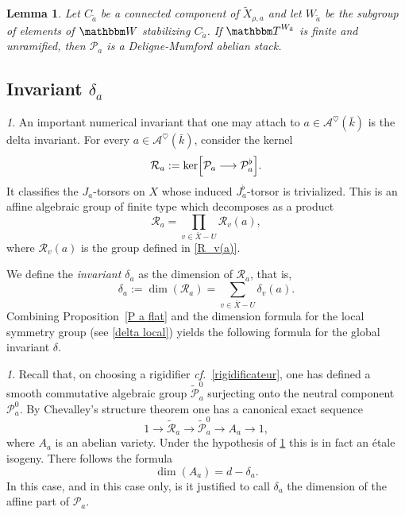 \documentclass[12pt,english]{smfart}
\numberwithin{equation}{subsection}
\newtheorem{lemme}[equation]{Lemma}
\theoremstyle{remark}
\newtheorem{numero}[equation]{}
\newcommand\calP{{\mathscr P}}
\newcommand\calR{{\mathscr R}}
\newcommand\bbW{{\mathbbm W}}
\newcommand\bbT{{\mathbbm T}}
\newcommand\cf{{\it cf.\ }}
\begin{document}
\begin{lemme}\label{P champ abelien}
Let $C_{\tilde a}$ be a connected component of $\widetilde X_{\rho,a}$ and let $W_{\tilde a}$ be the subgroup of elements of $\bbW$ stabilizing $C_{\tilde a}$. If $\bbT^{W_{\tilde a}}$ is finite and unramified, then $\calP_a$ is a Deligne-Mumford abelian stack.
\end{lemme}

\subsection{Invariant $\delta_a$}

\begin{numero}\label{invariant delta}
An important numerical invariant that one may attach to $a\in\mathcal{A}^\heartsuit(\bar k)$ is the delta invariant. For every $a\in\mathcal{A}^\heartsuit(\bar{k})$, consider the kernel
\begin{equation}\label{R_a}
\mathcal{R}_a:=\ker\Bigl[\mathcal{P}_a \longrightarrow \mathcal{P}_a^\flat\Bigr].
\end{equation}
It classifies the $J_a$-torsors on $X$ whose induced $J_a^\flat$-torsor is trivialized.
This is an affine algebraic group of finite type which decomposes as a product
$$
\mathcal{R}_a=\prod_{v\in \bar X-U}\mathcal{R}_v(a),
$$
where $\mathcal{R}_v(a)$ is the group defined in \ref{R_v(a)}.

We define the \emph{invariant $\delta_a$} as the dimension of $\mathcal{R}_a$, that is,
$$
\delta_a:=\dim(\mathcal{R}_a)=\sum_{v\in \bar X-U}\delta_v(a).
$$
Combining Proposition~\ref{P a flat} and the dimension formula for the local symmetry group (see \ref{delta local}) yields the following formula for the global invariant $\delta$.

\end{numero}

\begin{numero}\label{partie affine P_a}
Recall that, on choosing a rigidifier \cf \ref{rigidificateur}, one has defined a smooth commutative algebraic group $\tilde{\calP}^0_a$ surjecting onto the neutral component $\calP^0_a$. By Chevalley's structure theorem one has a canonical exact sequence
$$1\rightarrow \tilde{\calR}_a\rightarrow \tilde{\calP}^0_a\rightarrow A_a\rightarrow 1,$$
where $A_a$ is an abelian variety. Under the hypothesis of \ref{P champ abelien} this is in fact an \'etale isogeny. There follows the formula
$$\dim(A_a)=d-\delta_a.$$
In this case, and in this case only, is it justified to call $\delta_a$ the dimension of the affine part of $\calP_a$.
\end{numero}
\end{document}
